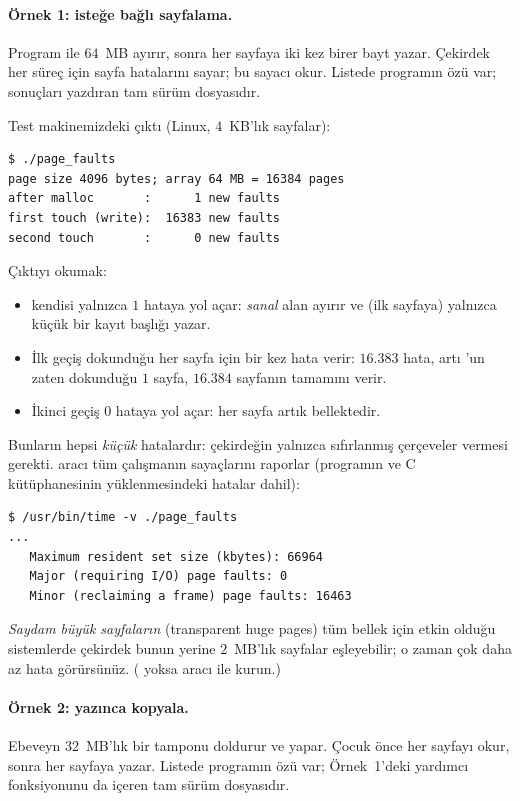 \paragraph{Örnek 1: isteğe bağlı sayfalama.} Program  ile $64$~MB ayırır, sonra her sayfaya iki kez birer bayt yazar. Çekirdek her süreç için sayfa hatalarını sayar;  bu sayacı okur. Listede programın özü var; sonuçları yazdıran tam sürüm  dosyasıdır.



Test makinemizdeki çıktı (Linux, $4$~KB'lık sayfalar):
\begin{lstlisting}[style=term]
$ ./page_faults
page size 4096 bytes; array 64 MB = 16384 pages
after malloc       :      1 new faults
first touch (write):  16383 new faults
second touch       :      0 new faults
\end{lstlisting}

Çıktıyı okumak:
\begin{itemize}
  \item {} kendisi yalnızca $1$ hataya yol açar: \emph{sanal} alan ayırır ve (ilk sayfaya) yalnızca küçük bir kayıt başlığı yazar.
  \item İlk geçiş dokunduğu her sayfa için bir kez hata verir: $16.383$ hata, artı 'un zaten dokunduğu $1$ sayfa, $16.384$ sayfanın tamamını verir.
  \item İkinci geçiş $0$ hataya yol açar: her sayfa artık bellektedir.
\end{itemize}
Bunların hepsi \emph{küçük} hatalardır: çekirdeğin yalnızca sıfırlanmış çerçeveler vermesi gerekti.  aracı tüm çalışmanın sayaçlarını raporlar (programın ve C kütüphanesinin yüklenmesindeki hatalar dahil):
\begin{lstlisting}[style=term]
$ /usr/bin/time -v ./page_faults
...
   Maximum resident set size (kbytes): 66964
   Major (requiring I/O) page faults: 0
   Minor (reclaiming a frame) page faults: 16463
\end{lstlisting}
\emph{Saydam büyük sayfaların} (transparent huge pages) tüm bellek için etkin olduğu sistemlerde çekirdek bunun yerine $2$~MB'lık sayfalar eşleyebilir; o zaman çok daha az hata görürsünüz. ( yoksa aracı  ile kurun.)

\paragraph{Örnek 2: yazınca kopyala.} Ebeveyn $32$~MB'lık bir tamponu doldurur ve  yapar. Çocuk önce her sayfayı okur, sonra her sayfaya yazar. Listede programın özü var; Örnek~1'deki  yardımcı fonksiyonunu da içeren tam sürüm  dosyasıdır.


